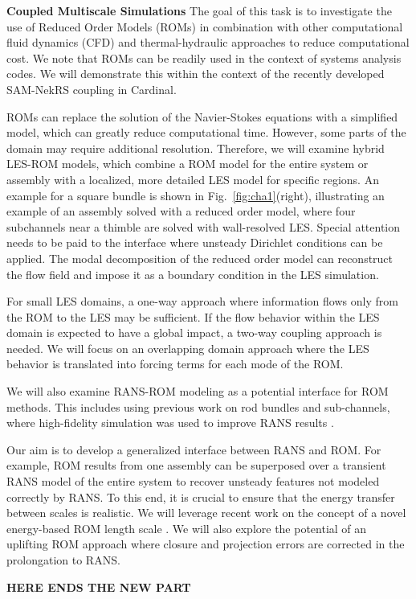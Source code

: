 \noindent \textbf{Coupled Multiscale Simulations}
The goal of this task is to investigate the use of Reduced Order Models (ROMs)
in combination with other computational fluid dynamics (CFD) and
thermal-hydraulic approaches to reduce computational cost. We note that ROMs
can be readily used in the context of systems analysis codes. We will
demonstrate this within the context of the recently developed SAM-NekRS
coupling in Cardinal.

ROMs can replace the solution of the Navier-Stokes equations with a simplified
model, which can greatly reduce computational time. However, some parts of the
domain may require additional resolution. Therefore, we will examine hybrid
LES-ROM models, which combine a ROM model for the entire system or assembly
with a localized, more detailed LES model for specific regions. An example for
a square bundle is shown in Fig.~\ref{fig:cha1}(right), illustrating an example
of an assembly solved with a reduced order model, where four subchannels near a
thimble are solved with wall-resolved LES. Special attention needs to be paid
to the interface where unsteady Dirichlet conditions can be applied. The modal
decomposition of the reduced order model can reconstruct the flow field and
impose it as a boundary condition in the LES simulation.

For small LES domains, a one-way approach where information flows only from the
ROM to the LES may be sufficient. If the flow behavior within the LES domain is
expected to have a global impact, a two-way coupling approach is needed. We
will focus on an overlapping domain approach where the LES behavior is
translated into forcing terms for each mode of the ROM.

We will also examine RANS-ROM modeling as a potential interface for ROM
methods. This includes using previous work on rod bundles and sub-channels,
where high-fidelity simulation was used to improve RANS results
\cite{martinez2019a}.

Our aim is to develop a generalized interface between RANS and ROM. For
example, ROM results from one assembly can be superposed over a transient RANS
model of the entire system to recover unsteady features not modeled correctly
by RANS. To this end, it is crucial to ensure that the energy transfer between
scales is realistic. We will leverage recent work on the concept of a novel
energy-based ROM length scale \cite{mou2021}. We will also explore the
potential of an uplifting ROM approach \cite{ahmed2020} where closure and
projection errors are corrected in the prolongation to RANS.


\textbf{HERE ENDS THE NEW PART}
\\
